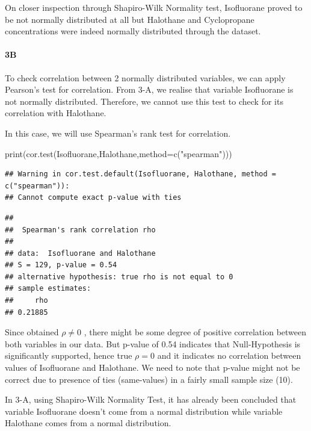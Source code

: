 \documentclass[
]{article}
\newenvironment{Shaded}{\begin{snugshade}}{\end{snugshade}}
\newcommand{\AttributeTok}[1]{\textcolor[rgb]{0.77,0.63,0.00}{#1}}
\newcommand{\FunctionTok}[1]{\textcolor[rgb]{0.00,0.00,0.00}{#1}}
\newcommand{\NormalTok}[1]{#1}
\newcommand{\StringTok}[1]{\textcolor[rgb]{0.31,0.60,0.02}{#1}}
\begin{document}
On closer inspection through Shapiro-Wilk Normality test, Isofluorane
proved to be not normally distributed at all but Halothane and
Cyclopropane concentrations were indeed normally distributed through the
dataset.

\hypertarget{b-2}{%
\paragraph{\texorpdfstring{\textbf{3B}}{3B}}\label{b-2}}

To check correlation between 2 normally distributed variables, we can
apply Pearson's test for correlation. From 3-A, we realise that variable
Isofluorane is not normally distributed. Therefore, we cannot use this
test to check for its correlation with Halothane.

In this case, we will use Spearman's rank test for correlation.

\begin{Shaded}
\begin{Highlighting}[]
\FunctionTok{print}\NormalTok{(}\FunctionTok{cor.test}\NormalTok{(Isofluorane,Halothane,}\AttributeTok{method=}\FunctionTok{c}\NormalTok{(}\StringTok{"spearman"}\NormalTok{)))}
\end{Highlighting}
\end{Shaded}

\begin{verbatim}
## Warning in cor.test.default(Isofluorane, Halothane, method = c("spearman")):
## Cannot compute exact p-value with ties
\end{verbatim}

\begin{verbatim}
## 
##  Spearman's rank correlation rho
## 
## data:  Isofluorane and Halothane
## S = 129, p-value = 0.54
## alternative hypothesis: true rho is not equal to 0
## sample estimates:
##     rho 
## 0.21885
\end{verbatim}

Since obtained \(\rho \neq 0\) , there might be some degree of positive
correlation between both variables in our data. But p-value of 0.54
indicates that Null-Hypothesis is significantly supported, hence true
\(\rho = 0\) and it indicates no correlation between values of
Isofluorane and Halothane. We need to note that p-value might not be
correct due to presence of ties (same-values) in a fairly small sample
size (10).

In 3-A, using Shapiro-Wilk Normality Test, it has already been concluded
that variable Isofluorane doesn't come from a normal distribution while
variable Halothane comes from a normal distribution.
\end{document}
